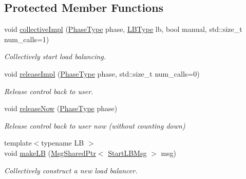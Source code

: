 \subsection*{Protected Member Functions}
\begin{DoxyCompactItemize}
\item 
void \hyperlink{structvt_1_1vrt_1_1collection_1_1balance_1_1_l_b_manager_a591eef7303a18ce4ef2fd35cfecbf512}{collective\+Impl} (\hyperlink{namespacevt_a46ce6733d5cdbd735d561b7b4029f6d7}{Phase\+Type} phase, \hyperlink{namespacevt_1_1vrt_1_1collection_1_1balance_ac4f99693509affcc67db182d4aad9b5c}{L\+B\+Type} lb, bool manual, std\+::size\+\_\+t num\+\_\+calls=1)
\begin{DoxyCompactList}\small\item\em Collectively start load balancing. \end{DoxyCompactList}\item 
void \hyperlink{structvt_1_1vrt_1_1collection_1_1balance_1_1_l_b_manager_a7e05ed9957f272ac5cc8b999f66fa403}{release\+Impl} (\hyperlink{namespacevt_a46ce6733d5cdbd735d561b7b4029f6d7}{Phase\+Type} phase, std\+::size\+\_\+t num\+\_\+calls=0)
\begin{DoxyCompactList}\small\item\em Release control back to user. \end{DoxyCompactList}\item 
void \hyperlink{structvt_1_1vrt_1_1collection_1_1balance_1_1_l_b_manager_a6ed483eb58a583c48f430276c2f25c14}{release\+Now} (\hyperlink{namespacevt_a46ce6733d5cdbd735d561b7b4029f6d7}{Phase\+Type} phase)
\begin{DoxyCompactList}\small\item\em Release control back to user now (without counting down) \end{DoxyCompactList}\item 
{\footnotesize template$<$typename LB $>$ }\\void \hyperlink{structvt_1_1vrt_1_1collection_1_1balance_1_1_l_b_manager_ab0499f916a5597bf2a0ed29dc295cb75}{make\+LB} (\hyperlink{namespacevt_ab2b3d506ec8e8d1540aede826d84a239}{Msg\+Shared\+Ptr}$<$ \hyperlink{structvt_1_1vrt_1_1collection_1_1balance_1_1_start_l_b_msg}{Start\+L\+B\+Msg} $>$ msg)
\begin{DoxyCompactList}\small\item\em Collectively construct a new load balancer. \end{DoxyCompactList}\end{DoxyCompactItemize}
